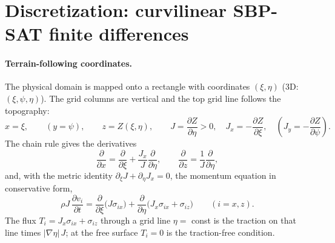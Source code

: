 \section{Discretization: curvilinear SBP-SAT finite differences}\label{sec:discretization}

\paragraph{Terrain-following coordinates.} The physical domain is mapped onto a rectangle with coordinates $(\xi,\eta)$
(3D: $(\xi,\psi,\eta)$). The grid columns are vertical and the top grid line follows the topography:
\begin{equation}
  x = \xi, \qquad (y = \psi), \qquad z = Z(\xi,\eta), \qquad
  J = \frac{\partial Z}{\partial \eta} > 0, \quad J_x = -\frac{\partial Z}{\partial \xi}, \quad (J_y = -\frac{\partial Z}{\partial \psi}).
\end{equation}
The chain rule gives the derivatives
\begin{equation}
  \frac{\partial}{\partial x} = \frac{\partial}{\partial \xi} + \frac{J_x}{J}\frac{\partial}{\partial \eta}, \qquad
  \frac{\partial}{\partial z} = \frac{1}{J}\frac{\partial}{\partial \eta},
  \label{eq:chain}
\end{equation}
and, with the metric identity $\partial_\xi J + \partial_\eta J_x = 0$, the momentum equation in conservative form,
\begin{equation}
  \rho J\,\frac{\partial v_i}{\partial t} = \frac{\partial}{\partial \xi}\big(J\sigma_{ix}\big)
     + \frac{\partial}{\partial \eta}\big(J_x\sigma_{ix} + \sigma_{iz}\big)
  \qquad (i = x, z).
  \label{eq:momentum_curv}
\end{equation}
The flux $T_i = J_x\sigma_{ix} + \sigma_{iz}$ through a grid line $\eta = $ const is the traction on that line times
$|\nabla\eta|\,J$; at the free surface $T_i = 0$ is the traction-free condition.

